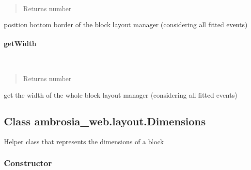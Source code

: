 \documentclass[letterpaper,10pt,english]{sphinxmanual}
\begin{document}
\begin{fulllineitems}
\label{ambrosia_web.layout.BlockLayoutManager:ambrosia_web.layout.BlockLayoutManager.getEndY}~\begin{quote}\begin{description}
\item[{Returns number}] \leavevmode
\end{description}\end{quote}

\end{fulllineitems}


position bottom border of the block layout manager (considering all fitted events)


\paragraph{getWidth}
\label{ambrosia_web.layout.BlockLayoutManager:getwidth}

\begin{fulllineitems}
\label{ambrosia_web.layout.BlockLayoutManager:ambrosia_web.layout.BlockLayoutManager.getWidth}~\begin{quote}\begin{description}
\item[{Returns number}] \leavevmode
\end{description}\end{quote}

\end{fulllineitems}


get the width of the whole block layout manager (considering all fitted events)


\subsection{Class ambrosia\_web.layout.Dimensions}
\label{ambrosia_web.layout.Dimensions:class-ambrosia-web-layout-dimensions}\label{ambrosia_web.layout.Dimensions::doc}
Helper class that represents the dimensions of a block


\subsubsection{Constructor}
\label{ambrosia_web.layout.Dimensions:constructor}
\end{document}
